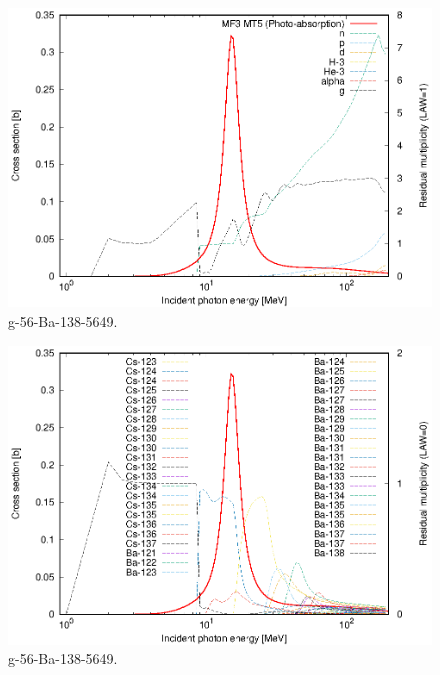 \begin{figure}
 \includegraphics[width=\linewidth]{eps/g_56-Ba-138_5649.eps}
  \caption{g-56-Ba-138-5649.}
\end{figure}
\begin{figure}
 \includegraphics[width=\linewidth]{eps-law0/g_56-Ba-138_5649.eps}
 \caption{g-56-Ba-138-5649.}
\end{figure}
\newpage \clearpage

